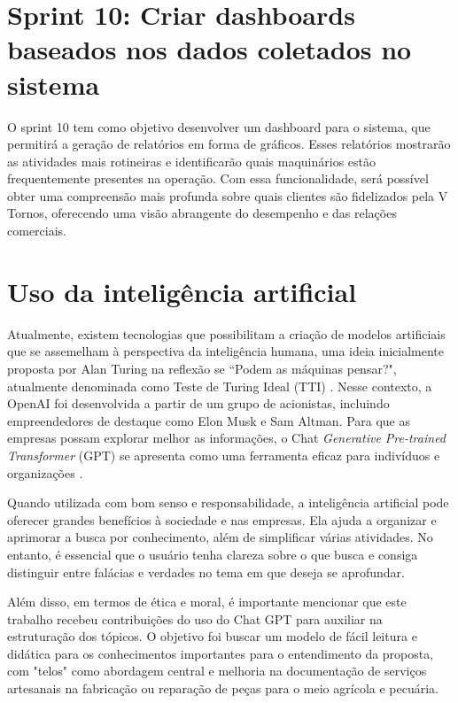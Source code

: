 \section{Sprint 10: Criar dashboards baseados nos dados coletados no sistema}
\label{sec:dashboards}

O sprint 10 tem como objetivo desenvolver um dashboard para o sistema, que permitirá a geração de relatórios em forma de gráficos. Esses relatórios mostrarão as atividades mais rotineiras e identificarão quais maquinários estão frequentemente presentes na operação. Com essa funcionalidade, será possível obter uma compreensão mais profunda sobre quais clientes são fidelizados pela V Tornos, oferecendo uma visão abrangente do desempenho e das relações comerciais.

\section{Uso da inteligência artificial}
\label{sec:IA}

Atualmente, existem tecnologias que possibilitam a criação de modelos artificiais que se assemelham à perspectiva da inteligência humana, uma ideia inicialmente proposta por Alan Turing na reflexão se ``Podem as máquinas pensar?", atualmente denominada como Teste de Turing Ideal (TTI) \cite{b:AI_Alan_Turing_2023}. Nesse contexto, a OpenAI foi desenvolvida a partir de um grupo de acionistas, incluindo empreendedores de destaque como Elon Musk e Sam Altman. Para que as empresas possam explorar melhor as informações, o Chat \textit{Generative Pre-trained Transformer} (GPT) se apresenta como uma ferramenta eficaz para indivíduos e organizações \mbox{\cite{a:chat_gpt_2023}.}

Quando utilizada com bom senso e responsabilidade, a inteligência artificial pode oferecer grandes benefícios à sociedade e nas empresas. Ela ajuda a organizar e aprimorar a busca por conhecimento, além de simplificar várias atividades. No entanto, é essencial que o usuário tenha clareza sobre o que busca e consiga distinguir entre falácias e verdades no tema em que deseja se aprofundar.

Além disso, em termos de ética e moral, é importante mencionar que este trabalho recebeu contribuições do uso do Chat GPT para auxiliar na estruturação dos tópicos. O objetivo foi buscar um modelo de fácil leitura e didática para os conhecimentos importantes para o entendimento da proposta, com "telos" como abordagem central e melhoria na documentação de serviços artesanais na fabricação ou reparação de peças para o meio agrícola e pecuária.
